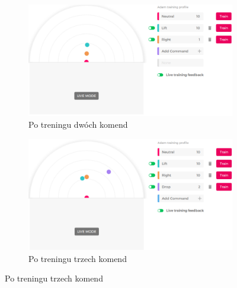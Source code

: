 \documentclass[skorowidz,skroty]{dyplomWEZUT}
\begin{document}
\begin{figure}[htb]
    \begin{subfigure}{0.49\textwidth}
    \includegraphics[width=\linewidth]{graphic/2commands}
    \caption{Po treningu dwóch komend\label{fig:brainmap_two}}
    \end{subfigure}\hspace*{\fill}
    \begin{subfigure}{0.49\textwidth}
    \includegraphics[width=\linewidth]{graphic/3commands}
    \caption{Po treningu trzech komend\label{fig:brainmap_three}}
    \end{subfigure}
    

\end{figure}
\end{document}
